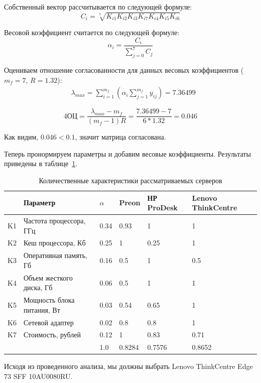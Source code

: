 \documentclass[russian,utf8,emptystyle]{eskdtext}
\begin{document}
Собственный вектор рассчитывается по следующей формуле:
$$
C_i = \sqrt[7]{K_{i1} K_{i2} K_{i3} K_{i7} K_{i4} K_{i5} K_{i6}}
$$

Весовой коэффициент считается по следующей формуле:
$$
\alpha_i = \frac{C_i}{\sum_{j=0}^{7} C_j}
$$

Оцениваем отношение согласованности для данных весовых коэффициентов ($m_f=7$, $R=1.32$):
\begin{align*}
&\lambda_{max} = \sum_{i=1}^{m_f}(\alpha_i \sum_{j=1}^{m_f} y_{ij}) = 7.36499
\end{align*}

$$4
\text{ОЦ} = \frac{\lambda_{max} - m_f}{(m_f - 1)R} = \frac{7.36499 - 7}{6*1.32} = 0.046
$$

Как видим, $0.046 < 0.1$, значит матрица согласована.

Теперь пронормируем параметры и добавим весовые коэффициенты. Результаты приведены в таблице~\ref{tab:server-4}.

\begin{longtable}{p{1cm}|p{7cm}|p{1cm}|p{2cm}|p{2cm}|p{2cm}}
\caption{Количественные характеристики рассматриваемых серверов}
\label{tab:server-4} \\
            & Параметр                     & $\alpha$ & Preon      & НР ProDesk & Lenovo ThinkCentre \\ 
\hline 
K1          & Частота процессора, ГГц      & 0.34     & 0.93       & 1          & 1        \\ 
K2          & Кеш процессора, Кб           & 0.25     & 1          & 0.25       & 1        \\
K3          & Оперативная память, Гб       & 0.16     & 0.5        & 1          & 0.5      \\ 
K4          & Объем жесткого диска, Гб     & 0.06     & 0.5        & 1          & 1        \\ 
K5          & Мощность блока питания, Вт   & 0.03     & 0.54       & 0.65       & 1        \\ 
K6          & Сетевой адаптер              & 0.02     & 0.8        & 0.8        & 1        \\ 
K7          & Стоимость, рублей            & 0.12     & 1          & 0.83       & 0.71     \\
\hline
            &                               & 1.0      & 0.8284     & 0.7576     & 0.8652
\end{longtable}

Исходя из проведенного анализа, мы должны выбрать Lenovo ThinkCentre Edge 73 SFF 10AU0080RU.
\end{document}
